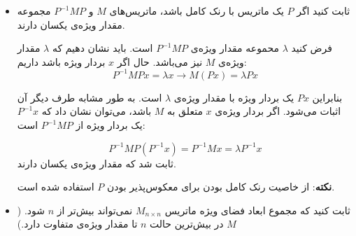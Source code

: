 \begin{itemize}
	\item ثابت کنید اگر $P$ یک ماتریس با رنک کامل باشد، ماتریس‌های $M$ و $P^{-1}MP$ مجموعه مقدار ویژه‌ی یکسان دارند.
	
	فرض کنید $\lambda$ محموعه مقدار ویژه‌ی $P^{-1}MP$ است. باید نشان دهیم که $\lambda$ مقدار ویژه‌ی $M$ نیز می‌باشد. حال اگر $x$ بردار ویژه باشد داریم:
	$$P^{-1}MPx = \lambda x \rightarrow M(Px) = \lambda Px$$
	
	بنابراین $Px$ یک بردار ویژه با مقدار ویژه‌ی $\lambda$ است. 
	به طور مشابه طرف دیگر آن اثبات می‌شود. اگر بردار ویژه‌ی $x$ متعلق به $M$ باشد، می‌توان نشان داد که $P^{-1}x$ یک بردار ویژه از $P^{-1}MP$ است:
	
	$$P^{-1}MP(P^{-1}x) = P^{-1}Mx = \lambda P^{-1}x$$
	ثابت شد که مقدار ویژه‌ی یکسان دارند. 
	
\textbf{نکته}: 
از خاصیت رنک کامل بودن برای معکوس‌پذیر بودن $P$ استفاده شده است.
\item ثابت کنید که مجموع ابعاد فضای ویژه ماتریس $M_{n\times n}$ نمی‌تواند بیش‌تر از $n$ شود. ($M$ در بیش‌ترین حالت $n$ تا مقدار ویژه‌ی متفاوت دارد.)


\end{itemize}